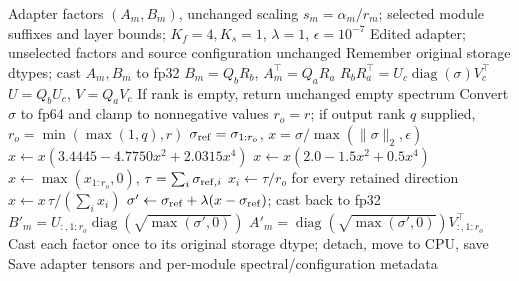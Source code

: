 \begin{algorithm}[t]
\caption{LoRA-Norm: data-free nuclear-preserving HNS (paper setting $4+1$)}
\label{alg:lora_norm_complete}
\begin{algorithmic}[1]
\Require Adapter factors $(A_m,B_m)$, unchanged scaling $s_m=\alpha_m/r_m$;
selected module suffixes and layer bounds; $K_f=4,K_s=1$, $\lambda=1$, $\epsilon=10^{-7}$
\Ensure Edited adapter; unselected factors and source configuration unchanged
  \State Remember original storage dtypes; cast $A_m,B_m$ to fp32
  \State $B_m=Q_bR_b$, $A_m^\top=Q_aR_a$ 
  \State $R_bR_a^\top=U_c\operatorname{diag}(\sigma)V_c^\top$ 
  \State $U=Q_bU_c$, $V=Q_aV_c$ 
  \State If rank is empty, return unchanged empty spectrum
  \State Convert $\sigma$ to fp64 and clamp to nonnegative values
  \State $r_o=r$; if output rank $q$ supplied, $r_o=\min(\max(1,q),r)$
  \State $\sigma_{\rm ref}=\sigma_{1:r_o}$, $x=\sigma/\max(\|\sigma\|_2,\epsilon)$
    \State $x\gets x(3.4445-4.7750x^2+2.0315x^4)$ 
  \EndFor
    \State $x\gets x(2.0-1.5x^2+0.5x^4)$
  \EndFor
  \State $x\gets\max(x_{1:r_o},0)$, $\tau=\sum_i\sigma_{{\rm ref},i}$
    \State $x_i\gets\tau/r_o$ for every retained direction
  \Else
    \State $x\gets x\,\tau/(\sum_i x_i)$ 
  \EndIf
  \State $\sigma'\gets\sigma_{\rm ref}+\lambda(x-\sigma_{\rm ref})$; cast back to fp32
  \State $B'_m=U_{:,1:r_o}\operatorname{diag}(\sqrt{\max(\sigma',0)})$
  \State $A'_m=\operatorname{diag}(\sqrt{\max(\sigma',0)})V_{:,1:r_o}^\top$
  \State Cast each factor once to its original storage dtype; detach, move to CPU, save
\EndFor
\State Save adapter tensors and per-module spectral/configuration metadata
\end{algorithmic}
\end{algorithm}
